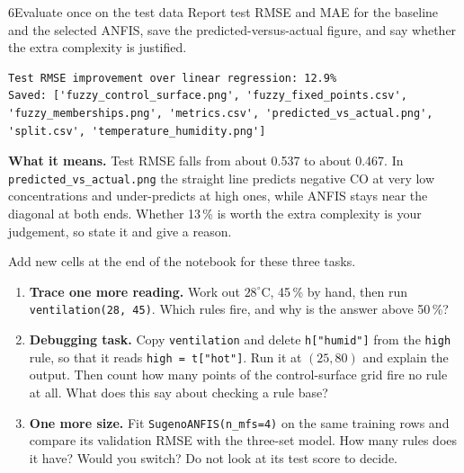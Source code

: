 \begin{labquestion}{6}{Evaluate once on the test data}
Report test RMSE and MAE for the baseline and the selected ANFIS, save the predicted-versus-actual figure, and say whether the extra complexity is justified.
\end{labquestion}
\begin{labanswer}

\begin{refoutput}
\begin{lstlisting}[style=utpterminal]
Test RMSE improvement over linear regression: 12.9%
Saved: ['fuzzy_control_surface.png', 'fuzzy_fixed_points.csv', 'fuzzy_memberships.png', 'metrics.csv', 'predicted_vs_actual.png', 'split.csv', 'temperature_humidity.png']
\end{lstlisting}
\end{refoutput}

\textbf{What it means.} Test RMSE falls from about 0.537 to about 0.467. In \texttt{predicted\_vs\_actual.png} the straight line predicts negative CO at very low concentrations and under-predicts at high ones, while ANFIS stays near the diagonal at both ends. Whether 13\,\% is worth the extra complexity is your judgement, so state it and give a reason.
\end{labanswer}

\begin{yourturn}
Add new cells at the end of the notebook for these three tasks.
\begin{enumerate}
  \item \textbf{Trace one more reading.} Work out $28^\circ$C, 45\,\% by hand, then run \texttt{ventilation(28, 45)}. Which rules fire, and why is the answer above 50\,\%?
  \item \textbf{Debugging task.} Copy \texttt{ventilation} and delete \texttt{h["humid"]} from the \texttt{high} rule, so that it reads \texttt{high = t["hot"]}. Run it at $(25, 80)$ and explain the output. Then count how many points of the control-surface grid fire no rule at all. What does this say about checking a rule base?
  \item \textbf{One more size.} Fit \texttt{SugenoANFIS(n\_mfs=4)} on the same training rows and compare its validation RMSE with the three-set model. How many rules does it have? Would you switch? Do not look at its test score to decide.
\end{enumerate}
\end{yourturn}

